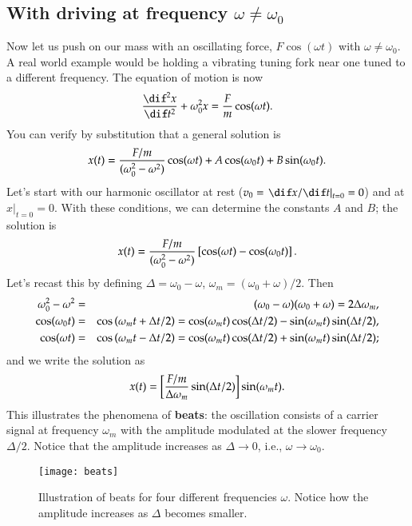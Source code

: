 \subsection{With driving at frequency $\omega \neq \omega_{0}$}

Now let us push on our mass with an oscillating force, $F\cos(\omega t)$ with $\omega\neq\omega_{0}$. A real world example would be holding a vibrating tuning fork near one tuned to a different frequency.  The equation of motion is now
\begin{equation}\label{e.SHO-driven}
	\DDtt{x} + \omega_{0}^{2}x = \frac{F}{m}\cos(\wt).
\end{equation}
You can verify by substitution that a general solution is
\[
	x(t) = \frac{F/m}{(\omega_{0}^{2}-\omega^{2})}\cos(\omega t) + A\cos(\omega_{0} t)+B\sin(\omega_{0} t).
\]
Let's start with our harmonic oscillator at rest ($v_{0} = \left.\dif x/\dif t\right|_{t=0} = 0$) and at $\left. x\right|_{t=0} = 0$.  With these conditions, we can determine the constants $A$ and $B$; the solution is
\[
	x(t) = \frac{F/m}{(\omega_{0}^{2}-\omega^{2})}\left[\cos(\omega t)-\cos(\omega_{0} t)\right].
\]
Let's recast this by defining $\Delta = \omega_{0} - \omega$, $\omega_{m} = (\omega_{0}+\omega)/2$.  Then
\begin{eqnarray*}
  \omega_{0}^{2}-\omega^{2} &=& (\omega_{0}-\omega)(\omega_{0}+\omega) = 2\Delta\omega_{m},\\
  \cos(\omega_{0} t) &=& \cos\left(\omega_{m} t+\Delta t/2\right) = \cos(\omega_{m} t)\cos(\Delta t/2) - \sin(\omega_{m} t)\sin(\Delta t/2),\\
  \cos(\omega t) &=& \cos\left(\omega_{m} t-\Delta t/2\right) = \cos(\omega_{m} t)\cos(\Delta t/2) + \sin(\omega_{m} t)\sin(\Delta t/2);
\end{eqnarray*}
and we write the solution as
\begin{equation}\label{e.beats}
	x(t) = \left[\frac{F/m}{\Delta\omega_{m}}\sin(\Delta t/2)\right]\sin(\omega_{m} t).
\end{equation}
This illustrates the phenomena of \textbf{beats}: the oscillation consists of a carrier signal at frequency $\omega_{m}$ with the amplitude modulated at the slower frequency $\Delta /2$.  Notice that the amplitude increases as $\Delta \to0$, i.e., $\omega\to\omega_{0}$.

\begin{figure*}[hbt]
\texttt{[image: beats]}
\caption[Illustration of beats for four different frequencies]{Illustration of beats for four different frequencies $\omega$.  Notice how the amplitude increases as $\Delta$ becomes smaller.
\label{f.beats}}
\end{figure*}


